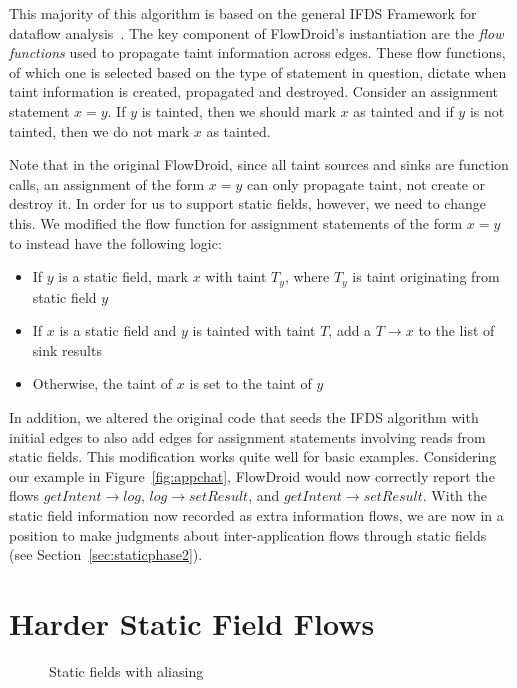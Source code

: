 This majority of this algorithm is based on the general IFDS Framework for dataflow analysis~\cite{ifds}. The key component of FlowDroid's instantiation are the \emph{flow functions} used to propagate taint information across edges. These flow functions, of which one is selected based on the type of statement in question, dictate when taint information is created, propagated and destroyed. Consider an assignment statement $x = y$. If $y$ is tainted, then we should mark $x$ as tainted and if $y$ is not tainted, then we do not mark $x$ as tainted. 

Note that in the original FlowDroid, since all taint sources and sinks are function calls, an assignment of the form $x = y$ can only propagate taint, not create or destroy it. In order for us to support static fields, however, we need to change this. We modified the flow function for assignment statements of the form $x = y$ to instead have the following logic:

\begin{itemize}
\item If $y$ is a static field, mark $x$ with taint $T_y$, where $T_y$ is taint originating from static field $y$
\item If $x$ is a static field and $y$ is tainted with taint $T$, add a $T\rightarrow x$ to the list of sink results
\item Otherwise, the taint of $x$ is set to the taint of $y$
\end{itemize}

In addition, we altered the original code that seeds the IFDS algorithm with initial edges to also add edges for assignment statements involving reads from static fields. This modification works quite well for basic examples. Considering our example in Figure~\ref{fig:appchat}, FlowDroid would now correctly report the flows $getIntent\rightarrow log$, $log\rightarrow setResult$, and $getIntent\rightarrow setResult$. With the static field information now recorded as extra information flows, we are now in a position to make judgments about inter-application flows through static fields (see Section~\ref{sec:staticphase2}).

\section{Harder Static Field Flows}

\begin{figure}
\begin{framed}
\begin{center}
\begin{minipage}{0.85\textwidth}

\end{minipage}
\end{center}
\caption{Static fields with aliasing}
\label{fig:aliased}
\end{framed}
\end{figure}

